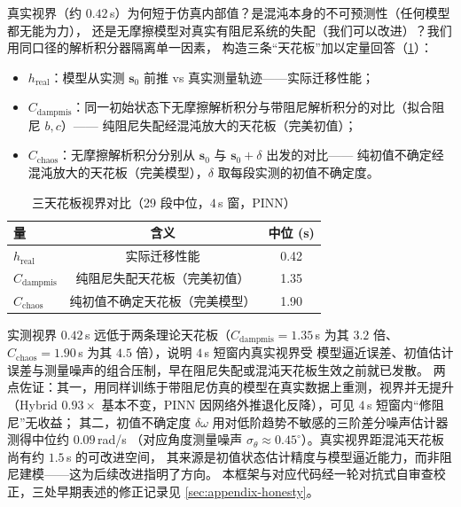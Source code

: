 \documentclass[a4paper,12pt]{ctexart}   %
\renewcommand{\emph}[1]{#1}
\begin{document}
真实视界（约 $0.42$\,s）为何短于仿真内部值？是混沌本身的不可预测性（任何模型都无能为力），
还是无摩擦模型对真实有阻尼系统的失配（我们可以改进）？我们用同口径的解析积分器隔离单一因素，
构造三条“天花板”加以定量回答（\cref{tab:three-ceiling}）：

\begin{itemize}[leftmargin=2em]
  \item $h_{\mathrm{real}}$：模型从实测 $\bm{s}_0$ 前推 vs 真实测量轨迹——实际迁移性能；
  \item $C_{\mathrm{dampmis}}$：同一初始状态下无摩擦解析积分与带阻尼解析积分的对比（拟合阻尼 $b,c$）——
        纯阻尼失配经混沌放大的天花板（完美初值）；
  \item $C_{\mathrm{chaos}}$：无摩擦解析积分分别从 $\bm{s}_0$ 与 $\bm{s}_0 + \delta$ 出发的对比——
        纯初值不确定经混沌放大的天花板（完美模型），$\delta$ 取每段实测的初值不确定度。
\end{itemize}

\begin{table}[h]
\centering
\caption{三天花板视界对比（29 段中位，$4$\,s 窗，PINN）}
\label{tab:three-ceiling}
\begin{tabular}{lcc}
\toprule
量 & 含义 & 中位 (s) \\
\midrule
$h_{\mathrm{real}}$    & 实际迁移性能                 & 0.42 \\
$C_{\mathrm{dampmis}}$ & 纯阻尼失配天花板（完美初值）   & 1.35 \\
$C_{\mathrm{chaos}}$   & 纯初值不确定天花板（完美模型） & 1.90 \\
\bottomrule
\end{tabular}
\end{table}

\noindent 实测视界 $0.42$\,s 远低于两条理论天花板（$C_{\mathrm{dampmis}} = 1.35$\,s 为其 $3.2$ 倍、
$C_{\mathrm{chaos}} = 1.90$\,s 为其 $4.5$ 倍），说明 $4$\,s 短窗内真实视界受
\emph{模型逼近误差、初值估计误差与测量噪声的组合}压制，早在阻尼失配或混沌天花板生效之前就已发散。
两点佐证：其一，用同样训练于带阻尼仿真的模型在真实数据上重测，视界并无提升
（Hybrid $0.93\times$ 基本不变，PINN 因网络外推退化反降），可见 $4$\,s 短窗内“修阻尼”无收益；
其二，初值不确定度 $\delta\omega$ 用对低阶趋势不敏感的三阶差分噪声估计器测得中位约 $0.09$\,rad/s
（对应角度测量噪声 $\sigma_\theta \approx 0.45^\circ$）。真实视界距混沌天花板尚有约 $1.5$\,s 的可改进空间，
其来源是初值状态估计精度与模型逼近能力，而非阻尼建模——这为后续改进指明了方向。
本框架与对应代码经一轮对抗式自审查校正，三处早期表述的修正记录见 \cref{sec:appendix-honesty}。
\end{document}
